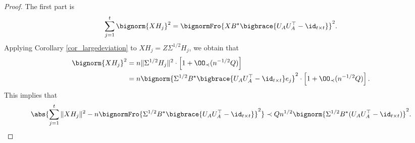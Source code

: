 \documentclass[aos,preprint]{imsart}
\begin{document}
\begin{proof}
\medskip
	 The first part is %
	\begin{align*} %
		\sum_{j=1}^t \bignorm{X H_j}^2
				= \bignormFro{X B^{\star} \bigbrace{U_{A} U_{A}^{\top} - \id_{t\times t}}}^2.
	\end{align*}
	Applying Corollary \ref{cor_largedeviation} to $X H_j = Z \Sigma^{1/2} H_j$, we obtain that 
	\begin{align*}
	\bignorm{X H_j}^2
 &= { n \|\Sigma^{1/2} H_j\|^2} \cdot \left[1 + \OO_\prec (n^{-1/2}Q)\right] \\
 &= n \bignorm{\Sigma^{1/2} B^{\star} \bigbrace{U_{A} U_{A}^{\top} - \id_{t\times t}}e_j}^2\cdot \left[1 + \OO_\prec (n^{-1/2}Q)\right] .
 \end{align*}
	This implies that %
	\begin{align*}
		\abs{\sum_{j=1}^t \|X H_j\|^2 -  n \bignormFro{\Sigma^{1/2} B^{\star} \bigbrace{U_{A} U_{A}^{\top} - \id_{t\times t}}}^2 } \prec Q   n^{1/2} \bignorm{\Sigma^{1/2} B^{\star} (U_{A}U_A^{\top} - \id_{t\times t})}^2. %
	\end{align*}


\end{proof}
\end{document}
